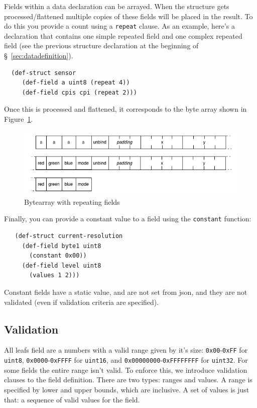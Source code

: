 \documentclass[12pt]{article}
\begin{document}
Fields within a data declaration can be arrayed. When the structure
gets processed/flattened multiple copies of these fields will be
placed in the result. To do this you provide a count using a
\verb|repeat| clause. As an example, here's a declaration that 
contains one simple repeated field and one complex repeated field 
(see the previous structure declaration at the beginning of
\S~\ref{sec:datadefinition}). 

\begin{verbatim}
  (def-struct sensor
     (def-field a uint8 (repeat 4))
     (def-field cpis cpi (repeat 2)))
\end{verbatim}

Once this is processed and flattened, it corresponds to the byte array
shown in Figure~\ref{fig:repeatingbytearray}.

\begin{figure}[htbp] %
   \centering
   \includegraphics[width=6in]{repeated_bytearray.png} 
\caption{Bytearray with repeating fields}
\label{fig:repeatingbytearray}
\end{figure}

Finally, you can provide a constant value to a field using the
\verb|constant| function:

\begin{verbatim}
   (def-struct current-resolution
     (def-field byte1 uint8
       (constant 0x00))
     (def-field level uint8
       (values 1 2)))
\end{verbatim}

Constant fields have a static value, and are not set from json, and
they are not validated (even if validation criteria are specified).

\subsection{Validation}

All leafs field are a numbers with a valid range given by it's size:
\verb|0x00|-\verb|0xFF| for \verb|uint8|, \verb|0x0000|-\verb|0xFFFF| for \verb|uint16|, and
\verb|0x00000000|-\verb|0xFFFFFFFF| for \verb|uint32|. For some fields the entire range
isn't valid. To enforce this, we introduce validation clauses to the
field definition. There are two types: ranges and values. A range is
specified by lower and upper bounds, which are inclusive. A set of
values is just that: a sequence of valid values for the field. 
\end{document}
